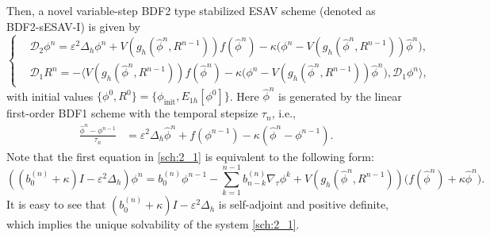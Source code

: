 \documentclass{m2an}
\newcommand{\md}{\mathcal{D}}
\begin{document}
Then, a novel variable-step BDF2 type stabilized ESAV scheme (denoted as BDF2-sESAV-I) is given by
\begin{equation}\label{sch:2_1}
	\left\{
	\begin{aligned}
		&\md_{2} \phi^{n} = \varepsilon^2 \Delta_h \phi^{n} + V( g_h(\hat{\phi}^{n}, R^{n-1}) ) f(\hat{\phi}^{n}) 
		- \kappa \big( \phi^{n} - V ( g_h(\hat{\phi}^{n}, R^{n-1}) ) \hat{\phi}^{n} \big), \\
		&\md_{1} R^{n}  = - \big\langle V ( g_h(\hat{\phi}^{n}, R^{n-1}) ) f(\hat{\phi}^{n}) 
		- \kappa \big( \phi^{n} - V ( g_h(\hat{\phi}^{n}, R^{n-1}) ) \hat{\phi}^{n} \big), \md_{1} \phi^{n} \big\rangle,
	\end{aligned}
	\right.
\end{equation}
with initial values $ \{ \phi^0, R^0 \} = \{ \phi_{\text{init}}, E_{1h}[\phi^{0}] \} $. Here $ \hat{\phi}^{n} $ is generated by the linear first-order BDF1 scheme  with the temporal stepsize $ \tau_{n} $, i.e.,
\begin{equation}\label{sch:2_3}
	\begin{aligned}
		\frac{\hat{\phi}^{n} - \phi^{n-1}}{ \tau_{n} } & = \varepsilon^2 \Delta_h \hat{\phi}^{n} + f(\phi^{n-1}) - \kappa ( \hat{\phi}^{n} - \phi^{n-1}) .
	\end{aligned}
\end{equation}
Note that the first equation in \eqref{sch:2_1} is equivalent to the following form:
\begin{equation*}\label{sch:2_4}
		(( b^{(n)}_{0} + \kappa ) I - \varepsilon^2 \Delta_h) \phi^{n} = b^{(n)}_{0} \phi^{n-1} - \sum^{n-1}_{k=1} b^{(n)}_{n-k} \nabla_{\tau} \phi^{k} +  V( g_h(\hat{\phi}^{n}, R^{n-1}) ) \big( f(\hat{\phi}^{n}) + \kappa \hat{\phi}^{n} \big) .
\end{equation*}
It is easy to see that $ ( b^{(n)}_{0} + \kappa ) I - \varepsilon^2 \Delta_h $ is self-adjoint and positive definite, which implies the unique solvability of the system \eqref{sch:2_1}.
\end{document}
